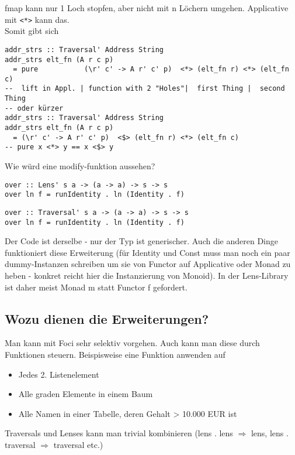 \documentclass{beamer}
\begin{document}
\begin{frame}[fragile]
fmap kann nur 1 Loch stopfen, aber nicht mit n Löchern umgehen.
Applicative mit \texttt{<*>} kann das.\\Somit gibt sich
\pause
\begin{verbatim}
addr_strs :: Traversal' Address String
addr_strs elt_fn (A r c p)
  = pure           (\r' c' -> A r' c' p)  <*> (elt_fn r) <*> (elt_fn c)
--  lift in Appl. | function with 2 "Holes"|  first Thing |  second Thing
-- oder kürzer
addr_strs :: Traversal' Address String
addr_strs elt_fn (A r c p)
  = (\r' c' -> A r' c' p)  <$> (elt_fn r) <*> (elt_fn c)
-- pure x <*> y == x <$> y
\end{verbatim}
\end{frame}

\begin{frame}[fragile]
Wie würd eine modify-funktion aussehen?
\pause
\begin{verbatim}
over :: Lens' s a -> (a -> a) -> s -> s
over ln f = runIdentity . ln (Identity . f)
\end{verbatim}
\pause
\begin{verbatim}
over :: Traversal' s a -> (a -> a) -> s -> s
over ln f = runIdentity . ln (Identity . f)
\end{verbatim}
\pause
Der Code ist derselbe - nur der Typ ist generischer. Auch die anderen
Dinge funktioniert diese Erweiterung (für Identity und Const muss man
noch ein paar dummy-Instanzen schreiben um sie von Functor auf
Applicative oder Monad zu heben - konkret reicht hier die Instanzierung
von Monoid). In der Lens-Library ist daher meist Monad m statt Functor f
gefordert.
\end{frame}

\subsection{Wozu dienen die Erweiterungen?}
\begin{frame}[fragile]
Man kann mit Foci sehr selektiv vorgehen. Auch kann man diese durch
Funktionen steuern. Beispisweise eine Funktion anwenden auf

\begin{itemize}
\item
  Jedes 2. Listenelement
\item
  Alle graden Elemente in einem Baum
\item
  Alle Namen in einer Tabelle, deren Gehalt \textgreater{} 10.000 EUR ist
\end{itemize}
\pause
Traversals und Lenses kann man trivial kombinieren (lens . lens
$\Rightarrow$ lens, lens . traversal $\Rightarrow$ traversal etc.)
\end{frame}
\end{document}
